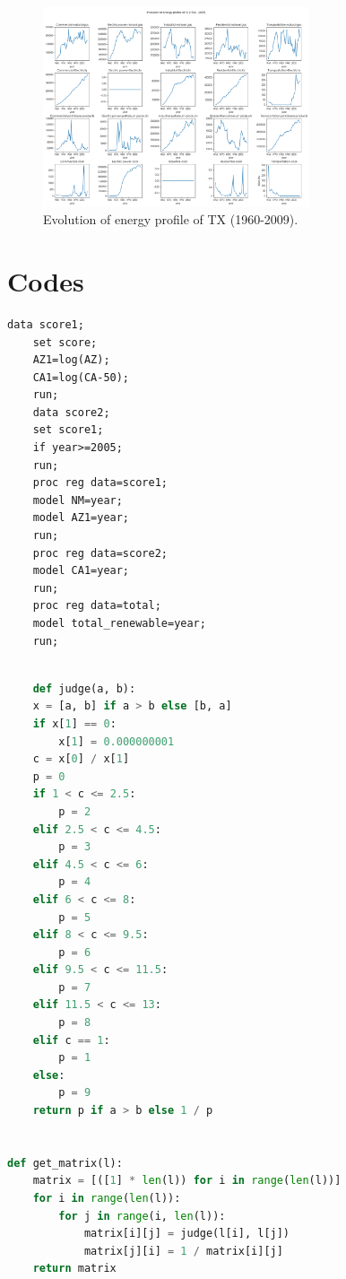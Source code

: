 \documentclass[a4paper,11pt]{article}
\begin{document}
\begin{appendices}
\begin{figure}[h]%
    \centering 
    \includegraphics[width=0.7\textwidth]{./Pic/B-classify-TX.png}
    \caption{Evolution of energy profile of TX (1960-2009).}
    \label{fig:part-2-TX}  
\end{figure}
\section*{Codes}

\begin{lstlisting}[language=SAS, caption=regression.sas]
    data score1;
    set score;
    AZ1=log(AZ);
    CA1=log(CA-50);
    run;
    data score2;
    set score1;
    if year>=2005;
    run;
    proc reg data=score1;
    model NM=year;
    model AZ1=year;
    run;
    proc reg data=score2;
    model CA1=year;
    run;
    proc reg data=total;
    model total_renewable=year;
    run;
\end{lstlisting}

\begin{lstlisting}[language=Python, caption=score.py]

    def judge(a, b):
    x = [a, b] if a > b else [b, a]
    if x[1] == 0:
        x[1] = 0.000000001
    c = x[0] / x[1]
    p = 0
    if 1 < c <= 2.5:
        p = 2
    elif 2.5 < c <= 4.5:
        p = 3
    elif 4.5 < c <= 6:
        p = 4
    elif 6 < c <= 8:
        p = 5
    elif 8 < c <= 9.5:
        p = 6
    elif 9.5 < c <= 11.5:
        p = 7
    elif 11.5 < c <= 13:
        p = 8
    elif c == 1:
        p = 1
    else:
        p = 9
    return p if a > b else 1 / p


def get_matrix(l):
    matrix = [([1] * len(l)) for i in range(len(l))]
    for i in range(len(l)):
        for j in range(i, len(l)):
            matrix[i][j] = judge(l[i], l[j])
            matrix[j][i] = 1 / matrix[i][j]
    return matrix



\end{lstlisting}
\end{appendices}
\end{document}
